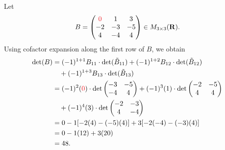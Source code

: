 \begin{example} \label{example 4.2.2}
Let
\[
    B= \begin{pmatrix}
        \RED{0} & 1 & 3 \\
        -2 & -3 & -5 \\
        4 & -4 & 4
    \end{pmatrix} \in M_{3 \X 3}(\SET{R}).
\]
Using cofactor expansion along the first row of \(B\), we obtain
\begin{align*}
    \det(B) & = (-1)^{1+1} B_{11} \cdot \det(\tilde{B}_{11}) + (-1)^{1+2} B_{12} \cdot \det(\tilde{B}_{12}) \\
            & \quad + (-1)^{1+3} B_{13} \cdot \det(\tilde{B}_{13}) \\
            & = (-1)^{2}(\RED{0}) \cdot
                \det \begin{pmatrix}
                    -3 & -5 \\
                    -4 & 4
                \end{pmatrix}
              + (-1)^{3}(1) \cdot
                \det\begin{pmatrix}
                    -2 & -5 \\
                    4 & 4
                \end{pmatrix} \\
            & \quad + (-1)^{4}(3) \cdot
                \det\begin{pmatrix}
                    -2 & -3 \\
                    4 & -4
                \end{pmatrix} \\
            & = 0 - 1[-2(4)-(-5)(4)] + 3[-2(-4)-(-3)(4)] \\
            & = 0 - 1(12) + 3(20) \\
            & = 48.
\end{align*}
\end{example}

